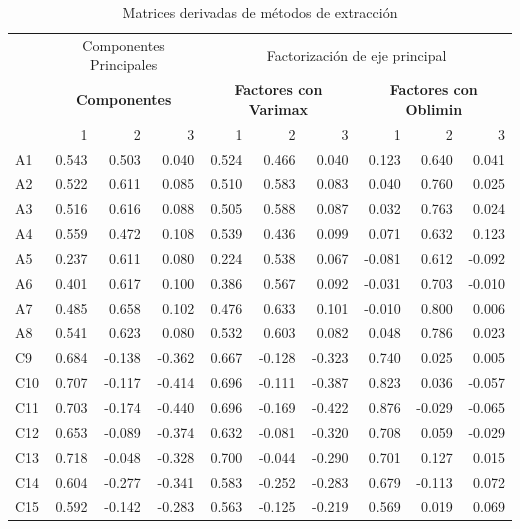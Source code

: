 \documentclass[
  10pt,
  spanish,
]{article}
\begin{document}
\begin{table}[H]

\caption{\label{tab:unnamed-chunk-11}Matrices derivadas de métodos de extracción}
\centering
\begin{tabular}[t]{lrrrrrrrrr}
\toprule
\multicolumn{1}{c}{ } & \multicolumn{3}{c}{Componentes Principales} & \multicolumn{6}{c}{Factorización de eje principal} \\
\cmidrule(l{3pt}r{3pt}){2-4} \cmidrule(l{3pt}r{3pt}){5-10}
\multicolumn{1}{c}{\textbf{ }} & \multicolumn{3}{c}{\textbf{Componentes}} & \multicolumn{3}{c}{\textbf{Factores con Varimax}} & \multicolumn{3}{c}{\textbf{Factores con Oblimin}} \\
\cmidrule(l{3pt}r{3pt}){2-4} \cmidrule(l{3pt}r{3pt}){5-7} \cmidrule(l{3pt}r{3pt}){8-10}
  & 1 & 2 & 3 & 1 & 2 & 3 & 1 & 2 & 3\\
\midrule
A1 & 0.543 & 0.503 & 0.040 & 0.524 & 0.466 & 0.040 & 0.123 & 0.640 & 0.041\\
A2 & 0.522 & 0.611 & 0.085 & 0.510 & 0.583 & 0.083 & 0.040 & 0.760 & 0.025\\
A3 & 0.516 & 0.616 & 0.088 & 0.505 & 0.588 & 0.087 & 0.032 & 0.763 & 0.024\\
A4 & 0.559 & 0.472 & 0.108 & 0.539 & 0.436 & 0.099 & 0.071 & 0.632 & 0.123\\
A5 & 0.237 & 0.611 & 0.080 & 0.224 & 0.538 & 0.067 & -0.081 & 0.612 & -0.092\\
A6 & 0.401 & 0.617 & 0.100 & 0.386 & 0.567 & 0.092 & -0.031 & 0.703 & -0.010\\
A7 & 0.485 & 0.658 & 0.102 & 0.476 & 0.633 & 0.101 & -0.010 & 0.800 & 0.006\\
A8 & 0.541 & 0.623 & 0.080 & 0.532 & 0.603 & 0.082 & 0.048 & 0.786 & 0.023\\
\addlinespace
C9 & 0.684 & -0.138 & -0.362 & 0.667 & -0.128 & -0.323 & 0.740 & 0.025 & 0.005\\
C10 & 0.707 & -0.117 & -0.414 & 0.696 & -0.111 & -0.387 & 0.823 & 0.036 & -0.057\\
C11 & 0.703 & -0.174 & -0.440 & 0.696 & -0.169 & -0.422 & 0.876 & -0.029 & -0.065\\
C12 & 0.653 & -0.089 & -0.374 & 0.632 & -0.081 & -0.320 & 0.708 & 0.059 & -0.029\\
C13 & 0.718 & -0.048 & -0.328 & 0.700 & -0.044 & -0.290 & 0.701 & 0.127 & 0.015\\
C14 & 0.604 & -0.277 & -0.341 & 0.583 & -0.252 & -0.283 & 0.679 & -0.113 & 0.072\\
C15 & 0.592 & -0.142 & -0.283 & 0.563 & -0.125 & -0.219 & 0.569 & 0.019 & 0.069\\

\end{tabular}
\end{table}
\end{document}
